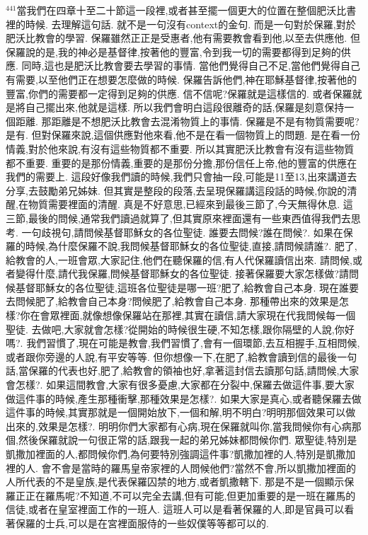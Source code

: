 \documentclass{book}
\begin{document}
$^{441}$當我們在四章十至二十節這一段裡,或者甚至擺一個更大的位置在整個肥沃比書裡的時候.
去理解這句話.
就不是一句沒有context的金句.
而是一句對於保羅,對於肥沃比教會的學習.
保羅雖然正正是受惠者,他有需要教會看到他,以至去供應他.
但保羅說的是,我的神必是基督律,按著他的豐富,令到我一切的需要都得到足夠的供應.
同時,這也是肥沃比教會要去學習的事情.
當他們覺得自己不足,當他們覺得自己有需要,以至他們正在想要怎麼做的時候.
保羅告訴他們,神在耶穌基督律,按著他的豐富,你們的需要都一定得到足夠的供應.
信不信呢?保羅就是這樣信的.
或者保羅就是將自己擺出來,他就是這樣.
所以我們會明白這段很離奇的話,保羅是刻意保持一個距離.
那距離是不想肥沃比教會去混淆物質上的事情.
保羅是不是有物質需要呢?是有.
但對保羅來說,這個供應對他來看,他不是在看一個物質上的問題.
是在看一份情義,對於他來說,有沒有這些物質都不重要.
所以其實肥沃比教會有沒有這些物質都不重要.
重要的是那份情義,重要的是那份分擔,那份信任上帝,他的豐富的供應在我們的需要上.
這段好像我們讀的時候,我們只會抽一段,可能是11至13,出來講道去分享,去鼓勵弟兄姊妹.
但其實是整段的段落,去呈現保羅講這段話的時候,你說的清醒,在物質需要裡面的清醒.
真是不好意思,已經來到最後三節了,今天無得休息.
這三節,最後的問候,通常我們讀過就算了,但其實原來裡面還有一些東西值得我們去思考.
一句歧視句,請問候基督耶穌女的各位聖徒.
誰要去問候?誰在問候?.
如果在保羅的時候,為什麼保羅不說,我問候基督耶穌女的各位聖徒,直接,請問候請誰?.
肥了,給教會的人,一班會眾,大家記住,他們在聽保羅的信,有人代保羅讀信出來.
請問候,或者變得什麼,請代我保羅,問候基督耶穌女的各位聖徒.
接著保羅要大家怎樣做?請問候基督耶穌女的各位聖徒,這班各位聖徒是哪一班?肥了,給教會自己本身.
現在誰要去問候肥了,給教會自己本身?問候肥了,給教會自己本身.
那種帶出來的效果是怎樣?你在會眾裡面,就像想像保羅站在那裡,其實在讀信,請大家現在代我問候每一個聖徒.
去做吧,大家就會怎樣?從開始的時候很生硬,不知怎樣,跟你隔壁的人說,你好嗎?.
我們習慣了,現在可能是教會,我們習慣了,會有一個環節,去互相握手,互相問候,或者跟你旁邊的人說,有平安等等.
但你想像一下,在肥了,給教會讀到信的最後一句話,當保羅的代表也好,肥了,給教會的領袖也好,拿著這封信去讀那句話,請問候,大家會怎樣?.
如果這間教會,大家有很多憂慮,大家都在分裂中,保羅去做這件事,要大家做這件事的時候,產生那種衝擊,那種效果是怎樣?.
如果大家是真心,或者聽保羅去做這件事的時候,其實那就是一個開始放下,一個和解,明不明白?明明那個效果可以做出來的,效果是怎樣?.
明明你們大家都有心病,現在保羅就叫你,當我問候你有心病那個,然後保羅就說一句很正常的話,跟我一起的弟兄姊妹都問候你們.
眾聖徒,特別是凱撒加裡面的人,都問候你們,為何要特別強調這件事?凱撒加裡的人,特別是凱撒加裡的人.
會不會是當時的羅馬皇帝家裡的人問候他們?當然不會,所以凱撒加裡面的人所代表的不是皇族,是代表保羅囚禁的地方,或者凱撒轄下.
那是不是一個顯示保羅正正在羅馬呢?不知道,不可以完全去講,但有可能,但更加重要的是一班在羅馬的信徒,或者在皇室裡面工作的一班人.
這班人可以是看著保羅的人,即是官員可以看著保羅的士兵,可以是在宮裡面服侍的一些奴僕等等都可以的.
\end{document}
